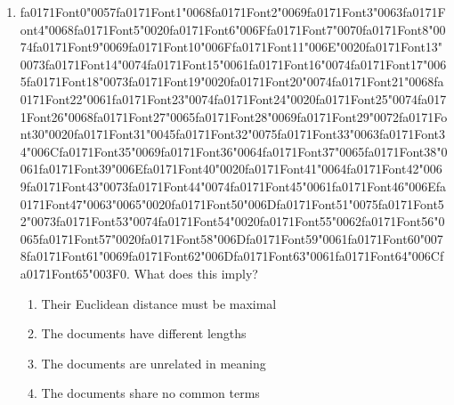 \documentclass[12pt]{article}
\begin{document}
\begin{enumerate}[label=Q\arabic*.]
 \item {\csname fa0171Font0\endcsname\char"0057}{\csname fa0171Font1\endcsname\char"0068}{\csname fa0171Font2\endcsname\char"0069}{\csname fa0171Font3\endcsname\char"0063}{\csname fa0171Font4\endcsname\char"0068}{\csname fa0171Font5\endcsname\char"0020}{\csname fa0171Font6\endcsname\char"006F}{\csname fa0171Font7\endcsname\char"0070}{\csname fa0171Font8\endcsname\char"0074}{\csname fa0171Font9\endcsname\char"0069}{\csname fa0171Font10\endcsname\char"006F}{\csname fa0171Font11\endcsname\char"006E}{\char"0020}{\csname fa0171Font13\endcsname\char"0073}{\csname fa0171Font14\endcsname\char"0074}{\csname fa0171Font15\endcsname\char"0061}{\csname fa0171Font16\endcsname\char"0074}{\csname fa0171Font17\endcsname\char"0065}{\csname fa0171Font18\endcsname\char"0073}{\csname fa0171Font19\endcsname\char"0020}{\csname fa0171Font20\endcsname\char"0074}{\csname fa0171Font21\endcsname\char"0068}{\csname fa0171Font22\endcsname\char"0061}{\csname fa0171Font23\endcsname\char"0074}{\csname fa0171Font24\endcsname\char"0020}{\csname fa0171Font25\endcsname\char"0074}{\csname fa0171Font26\endcsname\char"0068}{\csname fa0171Font27\endcsname\char"0065}{\csname fa0171Font28\endcsname\char"0069}{\csname fa0171Font29\endcsname\char"0072}{\csname fa0171Font30\endcsname\char"0020}{\csname fa0171Font31\endcsname\char"0045}{\csname fa0171Font32\endcsname\char"0075}{\csname fa0171Font33\endcsname\char"0063}{\csname fa0171Font34\endcsname\char"006C}{\csname fa0171Font35\endcsname\char"0069}{\csname fa0171Font36\endcsname\char"0064}{\csname fa0171Font37\endcsname\char"0065}{\csname fa0171Font38\endcsname\char"0061}{\csname fa0171Font39\endcsname\char"006E}{\csname fa0171Font40\endcsname\char"0020}{\csname fa0171Font41\endcsname\char"0064}{\csname fa0171Font42\endcsname\char"0069}{\csname fa0171Font43\endcsname\char"0073}{\csname fa0171Font44\endcsname\char"0074}{\csname fa0171Font45\endcsname\char"0061}{\csname fa0171Font46\endcsname\char"006E}{\csname fa0171Font47\endcsname\char"0063}{\char"0065}{\char"0020}{\csname fa0171Font50\endcsname\char"006D}{\csname fa0171Font51\endcsname\char"0075}{\csname fa0171Font52\endcsname\char"0073}{\csname fa0171Font53\endcsname\char"0074}{\csname fa0171Font54\endcsname\char"0020}{\csname fa0171Font55\endcsname\char"0062}{\csname fa0171Font56\endcsname\char"0065}{\csname fa0171Font57\endcsname\char"0020}{\csname fa0171Font58\endcsname\char"006D}{\csname fa0171Font59\endcsname\char"0061}{\csname fa0171Font60\endcsname\char"0078}{\csname fa0171Font61\endcsname\char"0069}{\csname fa0171Font62\endcsname\char"006D}{\csname fa0171Font63\endcsname\char"0061}{\csname fa0171Font64\endcsname\char"006C}{\csname fa0171Font65\endcsname\char"003F}$0$. What does this imply?
 \begin{enumerate}[label=(\Alph*)]
     \item Their Euclidean distance must be maximal
     \item The documents have different lengths
     \item The documents are unrelated in meaning
     \item The documents share no common terms
 \end{enumerate}
 

\end{enumerate}
\end{document}
